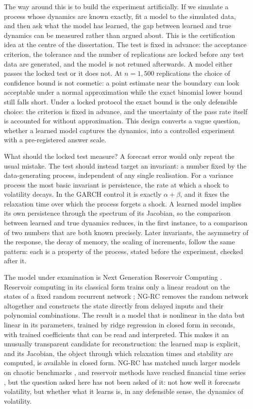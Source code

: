 \documentclass[12pt,a4paper]{article}
\begin{document}
The way around this is to build the experiment artificially. If we
simulate a process whose dynamics are known exactly, fit a model to the
simulated data, and then ask what the model has learned, the gap between
learned and true dynamics can be measured rather than argued about. This
is the certification idea at the centre of the dissertation. The test is
fixed in advance: the acceptance criterion, the tolerance and the number
of replications are locked before any test data are generated, and the
model is not retuned afterwards. A model either passes the locked test or
it does not. At $n = 1{,}500$ replications the choice of confidence
bound is not cosmetic: a point estimate near the boundary can look
acceptable under a normal approximation while the exact binomial lower
bound still falls short. Under a locked protocol the exact bound is the
only defensible choice: the criterion is fixed in advance, and the
uncertainty of the pass rate itself is accounted for without
approximation. This design converts a vague question, whether a learned
model captures the dynamics, into a controlled experiment with a
pre-registered answer scale.

What should the locked test measure? A forecast error would only repeat
the usual mistake. The test should instead target an invariant: a number
fixed by the data-generating process, independent of any single
realisation. For a variance process the most basic invariant is
persistence, the rate at which a shock to volatility decays. In the
GARCH control it is exactly $\alpha+\beta$, and it fixes the relaxation
time over which the process forgets a shock. A learned model implies its
own persistence through the spectrum of its Jacobian, so the comparison
between learned and true dynamics reduces, in the first instance, to a
comparison of two numbers that are both known precisely. Later
invariants, the asymmetry of the response, the decay of memory, the
scaling of increments, follow the same pattern: each is a property of
the process, stated before the experiment, checked after it.

The model under examination is Next Generation Reservoir Computing
\citep{gauthier2021}. Reservoir computing in its classical form trains
only a linear readout on the states of a fixed random recurrent network
\citep{jaegerhaas2004,lukosevicius2009}; NG-RC removes the random network
altogether and constructs the state directly from delayed inputs and their
polynomial combinations. The result is a model that is nonlinear in the
data but linear in its parameters, trained by ridge regression in
closed form in seconds, with trained coefficients that can be read and
interpreted. This makes it
an unusually transparent candidate for reconstruction: the learned map is
explicit, and its Jacobian, the object through which relaxation times and
stability are computed, is available in closed form. NG-RC has matched
much larger models on chaotic benchmarks \citep{pathak2018,vlachas2020},
and reservoir methods have reached financial time series
\citep{grigoryeva2014,dossantos2025,li2026}, but the question asked here
has not been asked of it: not how well it forecasts volatility, but
whether what it learns is, in any defensible sense, the dynamics of
volatility.
\end{document}
